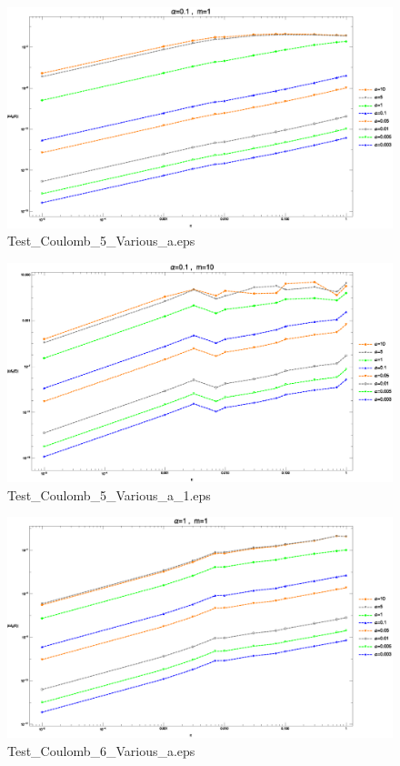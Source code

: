 \documentclass[hyperref]{ctexart}
\begin{document}
\begin{figure}
  \centering
  \includegraphics[width=6in]{Test_Coulomb_5_Various_a.eps}
  \caption{Test\_Coulomb\_5\_Various\_a.eps}
\end{figure}
\begin{figure}
  \centering
  \includegraphics[width=6in]{Test_Coulomb_5_Various_a_1.eps}
  \caption{Test\_Coulomb\_5\_Various\_a\_1.eps}
\end{figure}
\begin{figure}
  \centering
  \includegraphics[width=6in]{Test_Coulomb_6_Various_a.eps}
  \caption{Test\_Coulomb\_6\_Various\_a.eps}
\end{figure}
\end{document}
